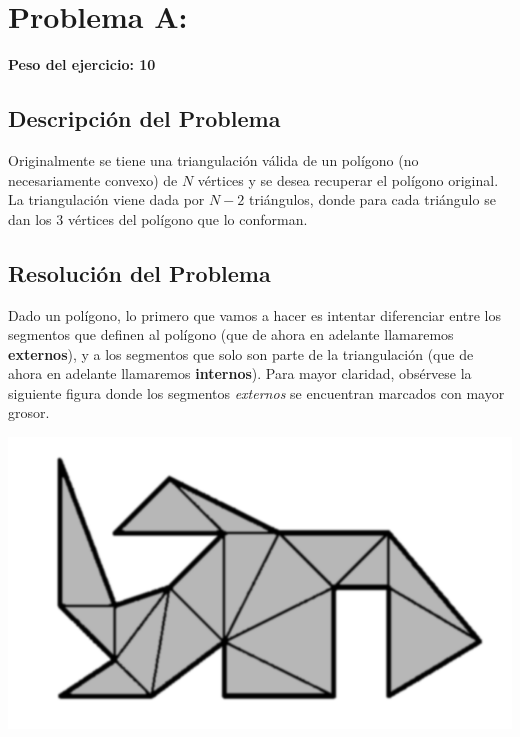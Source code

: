 \newpage{}
\section{Problema A: }
\textbf{Peso del ejercicio: 10}

\subsection{Descripción del Problema}

Originalmente se tiene una triangulación válida de un polígono (no necesariamente convexo) de $N$ vértices  y se desea recuperar el polígono original. La triangulación viene dada por $N-2$ triángulos, donde para cada triángulo se dan los $3$ vértices del polígono que lo conforman.

\subsection{Resolución del Problema}

Dado un polígono, lo primero que vamos a hacer es intentar diferenciar entre los segmentos que definen al polígono (que de ahora en adelante llamaremos \textbf{externos}), y a los segmentos que solo son parte de la triangulación (que de ahora en adelante llamaremos \textbf{internos}). Para mayor claridad, obsérvese la siguiente figura donde los segmentos \textit{externos} se encuentran marcados con mayor grosor.

\begin{center}
	\includegraphics[scale=0.2]{triangulacion.png}
\end{center}

